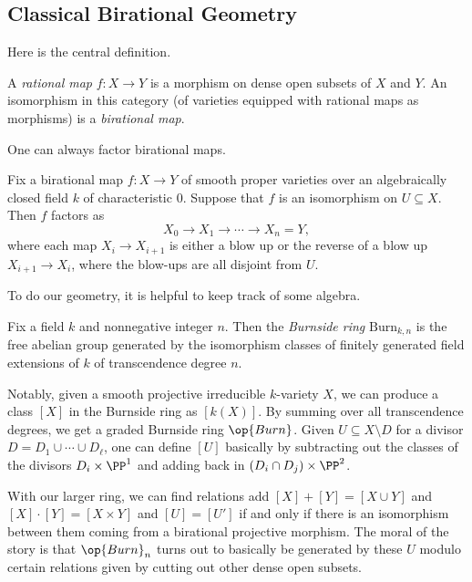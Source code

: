 \documentclass{article}
\begin{document}
\subsection{Classical Birational Geometry}
Here is the central definition.
\begin{definition}[birational]
    A \textit{rational map} $f\colon X\to Y$ is a morphism on dense open subsets of $X$ and $Y$. An isomorphism in this category (of varieties equipped with rational maps as morphisms) is a \textit{birational map}.
\end{definition}
One can always factor birational maps.
\begin{theorem} \label{thm:weak-factorization}
    Fix a birational map $f\colon X\to Y$ of smooth proper varieties over an algebraically closed field $k$ of characteristic $0$. Suppose that $f$ is an isomorphism on $U\subseteq X$. Then $f$ factors as
    \[X_0\to X_1\to\cdots\to X_n=Y,\]
    where each map $X_i\to X_{i+1}$ is either a blow up or the reverse of a blow up $X_{i+1}\to X_i$, where the blow-ups are all disjoint from $U$.
\end{theorem}
To do our geometry, it is helpful to keep track of some algebra.
\begin{definition}
    Fix a field $k$ and nonnegative integer $n$. Then the \textit{Burnside ring} $\mathrm{Burn}_{k,n}$ is the free abelian group generated by the isomorphism classes of finitely generated field extensions of $k$ of transcendence degree $n$.
\end{definition}
Notably, given a smooth projective irreducible $k$-variety $X$, we can produce a class $[X]$ in the Burnside ring as $[k(X)]$. By summing over all transcendence degrees, we get a graded Burnside ring $\op{Burn}$. Given $U\subseteq X\setminus D$ for a divisor $D=D_1\cup\cdots\cup D_\ell$, one can define $[U]$ basically by subtracting out the classes of the divisors $D_i\times\PP^1$ and adding back in $(D_i\cap D_j)\times\PP^2$.

With our larger ring, we can find relations add $[X]+[Y]=[X\cup Y]$ and $[X]\cdot[Y]=[X\times Y]$ and $[U]=[U']$ if and only if there is an isomorphism between them coming from a birational projective morphism. The moral of the story is that $\op{Burn}_n$ turns out to basically be generated by these $U$ modulo certain relations given by cutting out other dense open subsets.
\end{document}
